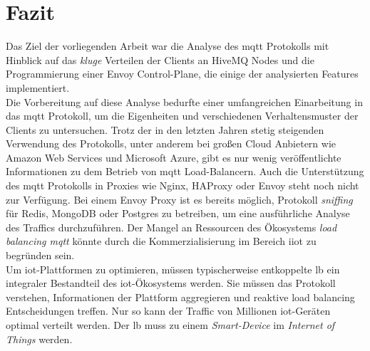 \section{Fazit}
Das Ziel der vorliegenden Arbeit war die Analyse des \ac{mqtt} Protokolls mit Hinblick auf das \textit{kluge} Verteilen der Clients an HiveMQ Nodes und die Programmierung einer Envoy Control-Plane, die einige der analysierten Features implementiert.
\\
Die Vorbereitung auf diese Analyse bedurfte einer umfangreichen Einarbeitung in das \ac{mqtt} Protokoll, um die Eigenheiten und verschiedenen Verhaltensmuster der Clients zu untersuchen.
Trotz der in den letzten Jahren stetig steigenden Verwendung des Protokolls, unter anderem bei gro{\ss}en Cloud Anbietern wie Amazon Web Services und Microsoft Azure, gibt es nur wenig veröffentlichte Informationen zu dem Betrieb von \ac{mqtt} Load-Balancern.
Auch die Unterstützung des \ac{mqtt} Protokolls in Proxies wie Nginx, HAProxy oder Envoy steht noch nicht zur Verfügung.
Bei einem Envoy Proxy ist es bereits möglich, Protokoll \textit{sniffing} für Redis, MongoDB oder Postgres zu betreiben, um eine ausführliche Analyse des Traffics durchzuführen.
Der Mangel an Ressourcen des Ökosystems \textit{load balancing \ac{mqtt}} könnte durch die Kommerzialisierung im Bereich \ac{iiot} zu begründen sein.
\\
Um \ac{iot}-Plattformen zu optimieren, müssen typischerweise entkoppelte \acl{lb} ein integraler Bestandteil des \ac{iot}-Ökosystems werden.
Sie müssen das Protokoll verstehen, Informationen der Plattform aggregieren und reaktive load balancing Entscheidungen treffen.
Nur so kann der Traffic von Millionen \ac{iot}-Geräten optimal verteilt werden.
Der \acl{lb} muss zu einem \textit{Smart-Device} im \textit{Internet of Things} werden.
\newpage

